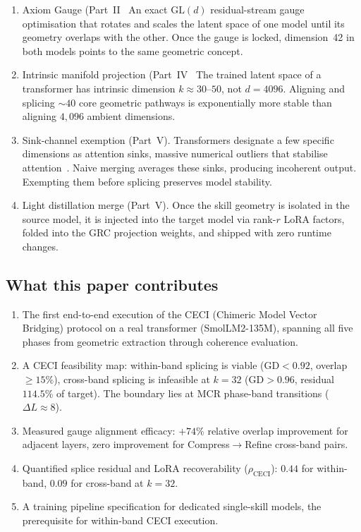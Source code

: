 \documentclass[11pt]{article}
\begin{document}
\begin{enumerate}
\item Axiom Gauge (Part~II~\cite{stewart2026gp).} An exact
 $\mathrm{GL}(d)$ residual-stream gauge optimisation that rotates
 and scales the latent space of one model until its geometry
 overlaps with the other. Once the gauge is locked, dimension~42
 in both models points to the same geometric concept.

\item Intrinsic manifold projection (Part~IV~\cite{stewart2026ott).}
 The trained latent space of a transformer has intrinsic dimension
 $k{\approx}30$--$50$, not $d{=}4096$. Aligning and splicing
 ${\sim}40$ core geometric pathways is exponentially more stable
 than aligning $4{,}096$ ambient dimensions.

\item Sink-channel exemption (Part~V). Transformers designate
 a few specific dimensions as attention sinks, massive numerical
 outliers that stabilise attention~\cite{sun2024massive,
 xiao2023streamingllm}. Naive merging averages these sinks,
 producing incoherent output. Exempting them before splicing
 preserves model stability.

\item Light distillation merge (Part~V). Once the skill
 geometry is isolated in the source model, it is injected into the
 target model via rank-$r$ LoRA factors, folded into the GRC
 projection weights, and shipped with zero runtime changes.
\end{enumerate}

\subsection{What this paper contributes}

\begin{enumerate}
\item The first end-to-end execution of the CECI (Chimeric Model Vector
 Bridging) protocol on a real transformer (SmolLM2-135M), spanning
 all five phases from geometric extraction through coherence
 evaluation.
\item A CECI feasibility map: within-band splicing is viable
 (GD${<}0.92$, overlap ${\ge}15\%$), cross-band splicing is
 infeasible at $k{=}32$ (GD${>}0.96$, residual $114.5\%$ of target).
 The boundary lies at MCR phase-band transitions ($\Delta L{\approx}8$).
\item Measured gauge alignment efficacy: $+74\%$ relative overlap
 improvement for adjacent layers, zero improvement for
 Compress$\to$Refine cross-band pairs.
\item Quantified splice residual and LoRA recoverability ($\rho_{\mathrm{CECI}}$):
 $0.44$ for within-band, $0.09$ for cross-band at $k{=}32$.
\item A training pipeline specification for dedicated single-skill
 models, the prerequisite for within-band CECI execution.
\end{enumerate}
\end{document}
